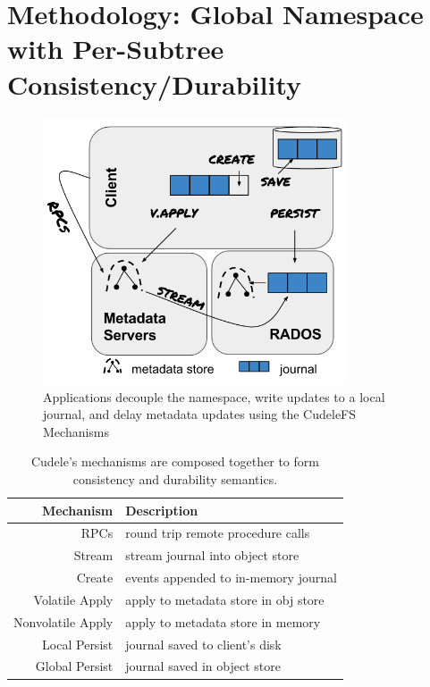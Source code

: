 \section{Methodology: Global Namespace with Per-Subtree Consistency/Durability}
\label{sec:methodology-decoupled-namespaces}

\begin{figure}[tb]
\centering
\includegraphics[width=90mm]{figures/fig-decouple.png}
\caption{Applications decouple the namespace, write updates to a local journal,
and delay metadata updates using the CudeleFS Mechanisms }\label{fig:decouple}
\end{figure}

\begin{table}
\begin{tabular}{ r | l }
  Mechanism         & Description \\\hline
  RPCs              & round trip remote procedure calls \\
  Stream            & stream journal into object store \\
  Create            & events appended to in-memory journal \\
  Volatile Apply    & apply to metadata store in obj store \\
  Nonvolatile Apply & apply to metadata store in memory \\
  Local Persist     & journal saved to client's disk \\
  Global Persist    & journal saved in object store \\
\end{tabular}
\caption{Cudele's mechanisms are composed together to form consistency and
durability semantics.\label{table:mechanisms}} 
\end{table}

